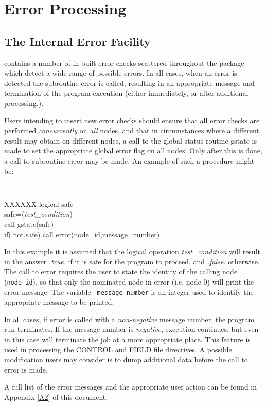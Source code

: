 \section{\D{} Error Processing\label{errorprocess}}
\subsection{The \D{} Internal Error Facility}

\D{} contains a number of in-built error checks scattered
throughout the package which detect a wide range of possible errors.
In all cases, when an error is detected the subroutine {\sc error}
is called, resulting in an appropriate message and termination of the
program execution (either immediately, or after additional
processing.).

Users intending to insert new error checks should ensure that all
error checks are performed {\em concurrently} on {\em all} nodes, and
that in circumstances where a different result may obtain on different
nodes, a call to the global status routine {\sc gstate} is made to set
the appropriate global error flag on all nodes. Only after this is
done, a call to subroutine {\sc error} may be made. An example of such
a procedure might be:

{\tt
\begin{tabbing}
XXXXXX\=\kill
\> logical safe\\
\> safe=({\em test\_condition})\\
\> call gstate(safe)\\
\> if(.not.safe) call error(node\_id,message\_number)\\
\end{tabbing}
}

In this example it is assumed that the logical operation {\em
test\_condition} will result in the answer {\em .true.} if it is safe
for the program to proceed, and {\em .false.} otherwise. The call to
{\sc error} requires the user to state the identity of the calling
node ({\tt node\_id}), so that only the nominated node in {\sc error}
(i.e. node 0) will print the error message. The variable {\tt
message\_number} is an integer used to identify the appropriate
message to be printed. 

In all cases, if {\sc error} is called with a {\em non-negative}
message number, the program run terminates. If the message
number is {\em negative}, execution continues, but even in this case
\D{} will terminate the job at a more appropriate place. This
feature is used in processing the CONTROL and FIELD file directives.
A possible modification users may consider is to dump additional data
before the call to {\sc error} is made.

A full list of the \D{} error messages  and the
appropriate user action can be found in Appendix \ref{A2} of this document.

